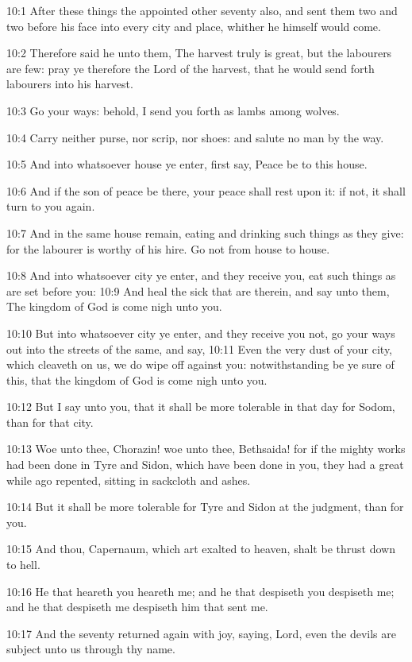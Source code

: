10:1 After these things the \LORD appointed other seventy also, and sent them two and two before his face into every city and place, whither he himself would come.

10:2 Therefore said he unto them, The harvest truly is great, but the labourers are few: pray ye therefore the Lord of the harvest, that he would send forth labourers into his harvest.

10:3 Go your ways: behold, I send you forth as lambs among wolves.

10:4 Carry neither purse, nor scrip, nor shoes: and salute no man by the way.

10:5 And into whatsoever house ye enter, first say, Peace be to this house.

10:6 And if the son of peace be there, your peace shall rest upon it: if not, it shall turn to you again.

10:7 And in the same house remain, eating and drinking such things as they give: for the labourer is worthy of his hire. Go not from house to house.

10:8 And into whatsoever city ye enter, and they receive you, eat such things as are set before you: 10:9 And heal the sick that are therein, and say unto them, The kingdom of God is come nigh unto you.

10:10 But into whatsoever city ye enter, and they receive you not, go your ways out into the streets of the same, and say, 10:11 Even the very dust of your city, which cleaveth on us, we do wipe off against you: notwithstanding be ye sure of this, that the kingdom of God is come nigh unto you.

10:12 But I say unto you, that it shall be more tolerable in that day for Sodom, than for that city.

10:13 Woe unto thee, Chorazin! woe unto thee, Bethsaida! for if the mighty works had been done in Tyre and Sidon, which have been done in you, they had a great while ago repented, sitting in sackcloth and ashes.

10:14 But it shall be more tolerable for Tyre and Sidon at the judgment, than for you.

10:15 And thou, Capernaum, which art exalted to heaven, shalt be thrust down to hell.

10:16 He that heareth you heareth me; and he that despiseth you despiseth me; and he that despiseth me despiseth him that sent me.

10:17 And the seventy returned again with joy, saying, Lord, even the devils are subject unto us through thy name.

